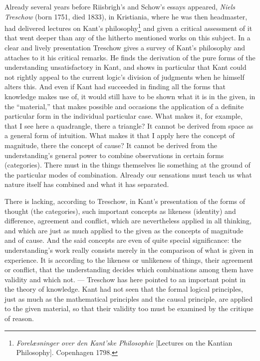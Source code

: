 \documentclass[12pt,a4paper]{book}
\newcommand{\opage}[1]{\marginnote{\footnotesize\textit{[#1]}}}
\begin{document}
Already several years before Riisbrigh's and Schow's essays appeared, \emph{Niels Treschow}
(born 1751, died 1833), in Kristiania, where he was then headmaster, had delivered
lectures on Kant's philosophy\footnote{\emph{Forelæsninger over den Kant'ske
Philosophie} [Lectures on the Kantian Philosophy]. Copenhagen 1798.} and given a
critical assessment of it that went deeper than any of the hitherto mentioned works
on this subject. In a clear and lively presentation Treschow gives a survey of
Kant's philosophy and attaches to it his critical remarks. He finds the derivation
of the pure forms of the understanding unsatisfactory in Kant, and shows in
particular that Kant could not rightly appeal to the current logic's division of
judgments when he himself alters this. And even if Kant had succeeded in finding all
the forms that knowledge makes use of, it would still have to be shown what it is in
the given, in the ``material,'' that makes possible and occasions the application of
a definite particular form in the individual particular case. What makes it, for
example, that I see here a quadrangle, there a triangle? It cannot be derived from
space as a general form of intuition. What makes it that I apply here the concept of
magnitude, there the concept of cause? It cannot be derived from the understanding's
general power to combine observations in certain forms (categories). There must in
the things themselves lie something at the ground of the particular modes of
combination. Already our sensations must teach us what nature itself has combined
and what it has separated.

There is lacking, according to Treschow, in Kant's presentation of the forms of
thought (the categories), such important concepts as likeness (identity) and
difference, agreement and conflict, which are nevertheless applied in all thinking,
and which are just as much applied to the given as the concepts of magnitude and of
cause. And the said concepts are even of quite special significance: the
understanding's work really consists merely in the comparison of \opage{38}what is given in
experience. It is according to the likeness or unlikeness of things, their agreement
or conflict, that the understanding decides which combinations among them have
validity and which not. --- Treschow has here pointed to an important point in the
theory of knowledge. Kant had not seen that the formal logical principles, just as
much as the mathematical principles and the causal principle, are applied to the
given material, so that their validity too must be examined by the critique of
reason.
\end{document}
